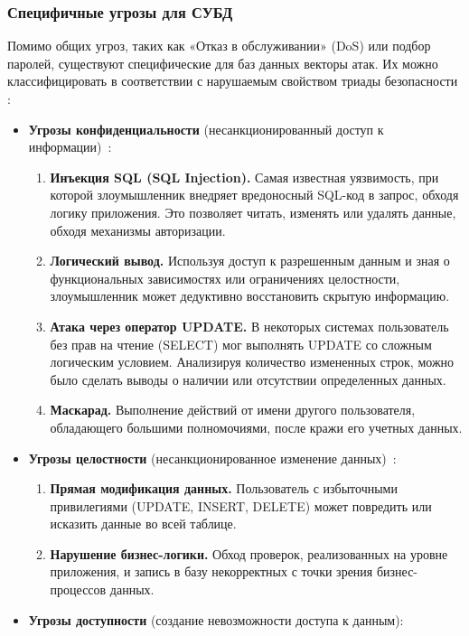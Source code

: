 \subsubsection{Специфичные угрозы для СУБД}
Помимо общих угроз, таких как «Отказ в обслуживании» (DoS) или подбор паролей, существуют специфические для баз данных векторы атак. Их можно классифицировать в соответствии с нарушаемым свойством триады безопасности \autocite{Ytebov2008, bdufstec}:

\begin{itemize}
	\item \textbf{Угрозы конфиденциальности} (несанкционированный доступ к информации)~\label{ugr:conf}:
	\begin{enumerate}
		\item \textbf{Инъекция SQL (SQL Injection).} Самая известная уязвимость, при которой злоумышленник внедряет вредоносный SQL-код в запрос, обходя логику приложения. Это позволяет читать, изменять или удалять данные, обходя механизмы авторизации.
		\item \textbf{Логический вывод.} Используя доступ к разрешенным данным и зная о функциональных зависимостях или ограничениях целостности, злоумышленник может дедуктивно восстановить скрытую информацию.
		\item \textbf{Атака через оператор UPDATE.} В некоторых системах пользователь без прав на чтение (SELECT) мог выполнять UPDATE со сложным логическим условием. Анализируя количество измененных строк, можно было сделать выводы о наличии или отсутствии определенных данных.
		\item \textbf{Маскарад.} Выполнение действий от имени другого пользователя, обладающего большими полномочиями, после кражи его учетных данных.
	\end{enumerate}
	\item \textbf{Угрозы целостности} (несанкционированное изменение данных)~\label{ugr:cel}:
	\begin{enumerate}
		\item \textbf{Прямая модификация данных.} Пользователь с избыточными привилегиями (UPDATE, INSERT, DELETE) может повредить или исказить данные во всей таблице.
        \item \textbf{Нарушение бизнес-логики.} Обход проверок, реализованных на уровне приложения, и запись в базу некорректных с точки зрения бизнес-процессов данных.
	\end{enumerate}
	\item \textbf{Угрозы доступности} (создание невозможности доступа к данным):

\end{itemize}
